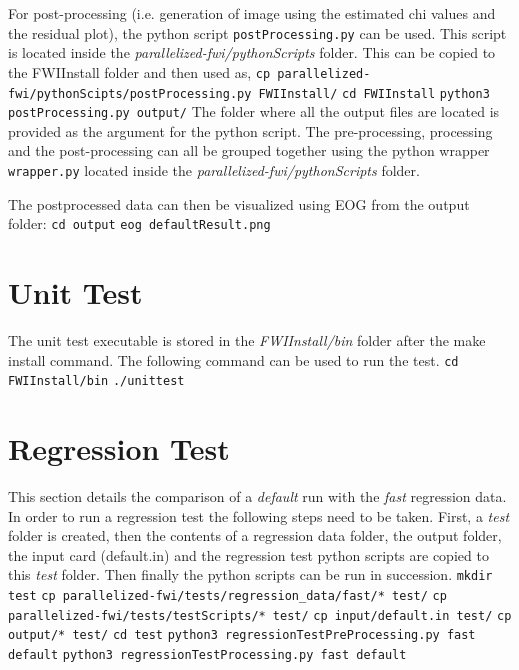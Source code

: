 \documentclass[10pt]{article}
\begin{document}
\newpage
\noindent For post-processing (i.e. generation of image using the estimated chi values and the residual plot), the python script \texttt{postProcessing.py} can be used. This script is located inside the \textit{parallelized-fwi/pythonScripts} folder. This can be copied to the FWIInstall folder and then used as,
\newline
\texttt{cp parallelized-fwi/pythonScipts/postProcessing.py FWIInstall/}
\newline
\texttt{cd FWIInstall}
\newline
\texttt{python3 postProcessing.py output/}
\newline
The folder where all the output files are located is provided as the argument for the python script. The pre-processing, processing and the post-processing can all be grouped together using the python wrapper \texttt{wrapper.py} located inside the \textit{parallelized-fwi/pythonScripts} folder.

\noindent The postprocessed data can then be visualized using EOG from the output folder:
\newline
\texttt{cd output}
\newline
\texttt{eog defaultResult.png}
\newline
 
\section{Unit Test}

The unit test executable is stored in the \textit{FWIInstall/bin} folder after the make install command. The following command can be used to run the test.
\newline
\texttt{cd FWIInstall/bin}
\newline
\texttt{./unittest}


\section{Regression Test}

This section details the comparison of a \textit{default} run with the \textit{fast} regression data. In order to run a regression test the following steps need to be taken. First, a \textit{test} folder is created, then the contents of a regression data folder, the output folder, the input card (default.in) and the regression test python scripts are copied to this \textit{test} folder. Then finally the python scripts can be run in succession.  
\newline
\texttt{mkdir test}
\newline
\texttt{cp parallelized-fwi/tests/regression\_data/fast/* test/}
\newline
\texttt{cp parallelized-fwi/tests/testScripts/* test/}
\newline
\texttt{cp input/default.in test/}
\newline
\texttt{cp output/* test/}
\newline
\texttt{cd test}
\newline
\texttt{python3 regressionTestPreProcessing.py fast default}
\newline
\texttt{python3 regressionTestProcessing.py fast default}
\end{document}
